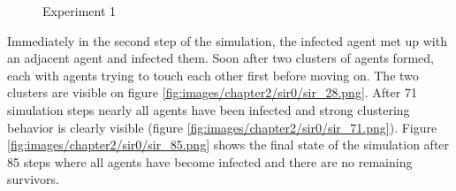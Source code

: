 \begin{figure}[H]
    \centering
    \hspace*{\fill}

    \hspace*{\fill}

    \caption{Experiment 1} \label{fig:experiment0}
\end{figure}

Immediately in the second step of the simulation, the infected agent met up with an adjacent agent and infected them.
Soon after two clusters of agents formed, each with agents trying to touch each other first before moving on.
The two clusters are visible on figure \ref{fig:images/chapter2/sir0/sir_28.png}.
After 71 simulation steps nearly all agents have been infected and strong clustering behavior is clearly visible (figure \ref{fig:images/chapter2/sir0/sir_71.png}).
Figure \ref{fig:images/chapter2/sir0/sir_85.png} shows the final state of the simulation after 85 steps where all agents have become infected and there are no remaining survivors.

